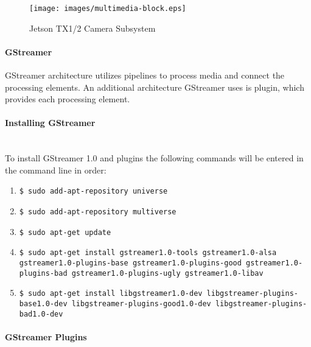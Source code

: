 	\begin{figure}[H]
		\centering
		\label{fig:MultimediaBlockDiagram}
		\texttt{[image: images/multimedia-block.eps]}
		\caption{Jetson TX1/2 Camera Subsystem\cite{CSubDia} \label{overflow}}
	\end{figure}

\paragraph{GStreamer}

GStreamer architecture utilizes pipelines to process media and connect the processing 
elements. An additional architecture GStreamer uses is plugin, which provides each 
processing element. \\

\paragraph{Installing GStreamer}\mbox{} \\ 

To install GStreamer 1.0 and plugins the following commands will be entered in the 
command line in order\cite{GStmUG}: \\

	\begin{enumerate}
		\item\texttt{\$ sudo add-apt-repository universe} \\
		\item\texttt{\$ sudo add-apt-repository multiverse} \\
		\item\texttt{\$ sudo apt-get update} \\
		\item\texttt{\$ sudo apt-get install gstreamer1.0-tools gstreamer1.0-alsa 
			gstreamer1.0-plugins-base \newline gstreamer1.0-plugins-good 
			gstreamer1.0-plugins-bad gstreamer1.0-plugins-ugly \newline
			gstreamer1.0-libav} \\
		\item\texttt{\$ sudo apt-get install libgstreamer1.0-dev libgstreamer-plugins-base1.0-dev \newline
		libgstreamer-plugins-good1.0-dev libgstreamer-plugins-bad1.0-dev} \\
	\end{enumerate}

\paragraph{GStreamer Plugins}\mbox{} \\ 

